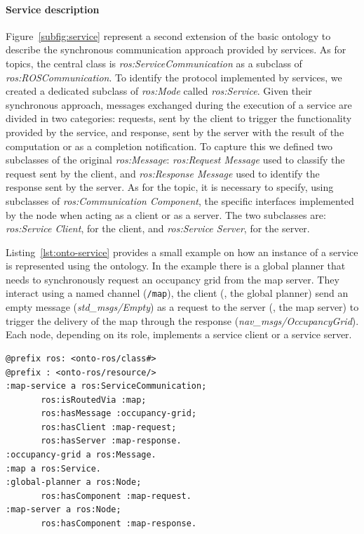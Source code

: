 \paragraph{Service description} Figure~\ref{subfig:service} represent a second extension of the basic ontology to describe the synchronous communication approach provided by services.  As for topics, the central class is \textit{ros:Service\-Com\-mu\-ni\-ca\-tion} as a subclass of \textit{ros:ROS\-Com\-mu\-ni\-ca\-tion}. To identify the protocol implemented by services, we created a dedicated subclass of \textit{ros:Mode} called \textit{ros:Service}. Given their
synchronous approach, messages exchanged during the execution of a service are divided in two categories: requests, sent by the client to trigger the functionality provided by the service, and response, sent by the server with the result of the computation or as a completion notification. To capture this we defined two subclasses of the original \textit{ros:Message}: \textit{ros:Request Message} used to classify the request sent by the client, and \textit{ros:Response Message} used to identify the response sent by the server. As for the topic, it is necessary to specify, using subclasses of \textit{ros:Communication Component}, the specific interfaces implemented by the node when acting as a client or as a server. The two subclasses are: \textit{ros:Service Client}, for the client, and \textit{ros:Service Server}, for the server.

Listing~\ref{lst:onto-service} provides a small example on how an instance of a service is represented using the ontology. In the example there is a global planner that needs to synchronously request an occupancy grid from the map server. They interact using a named channel (\texttt{/map}), the client (\ie, the global planner) send an empty message (\textit{std\_msgs/Empty}) as a request to the server (\ie, the map server) to trigger the delivery of the map through the response (\textit{nav\_msgs/OccupancyGrid}). Each node, depending on its role, implements a service client or a service server.

\begin{lstlisting}[frame=tb,caption={Instance of a service-based communication according to the ontology.},label=lst:onto-service]
@prefix ros: <onto-ros/class#>
@prefix : <onto-ros/resource/>
:map-service a ros:ServiceCommunication;
       ros:isRoutedVia :map;
       ros:hasMessage :occupancy-grid;
       ros:hasClient :map-request;
       ros:hasServer :map-response.
:occupancy-grid a ros:Message.
:map a ros:Service.  
:global-planner a ros:Node;
       ros:hasComponent :map-request.
:map-server a ros:Node;
       ros:hasComponent :map-response.
 \end{lstlisting}
 
